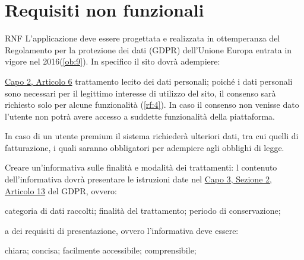 \section{Requisiti non funzionali}
\label{sec:RequisitiNonFunzionali}

\begin{listaPersonale}{RNF}
     L'applicazione deve essere progettata e realizzata in ottemperanza del Regolamento per la protezione dei dati (GDPR) dell'Unione Europa entrata in vigore nel 2016(\ref{ob:9}). In specifico il sito dovrà adempiere:
    \begin{listaPersonale2}{}
         \href{https://eur-lex.europa.eu/legal-content/IT/TXT/?uri=uriserv:OJ.L_.2016.119.01.0001.01.ITA&toc=OJ:L:2016:119:TOC#d1e1898-1-1}{Capo 2, Articolo 6} trattamento lecito dei dati personali; poiché i dati personali sono necessari per il legittimo interesse di utilizzo del sito, il consenso sarà richiesto solo per alcune funzionalità (\ref{rf:4}). In caso il consenso non venisse dato l'utente non potrà avere accesso a suddette funzionalità della piattaforma.
        \begin{listaPersonale3}{}
             In caso di un utente premium il sistema richiederà ulteriori dati, tra cui quelli di fatturazione, i quali saranno obbligatori per adempiere agli obblighi di legge.
        \end{listaPersonale3}

         Creare un'informativa sulle finalità e modalità dei trattamenti: l contenuto dell'informativa dovrà presentare le istruzioni date nel \href{https://eur-lex.europa.eu/legal-content/IT/TXT/?uri=uriserv:OJ.L_.2016.119.01.0001.01.ITA&toc=OJ:L:2016:119:TOC#d1e2261-1-1}{Capo 3, Sezione 2, Articolo 13} del GDPR, ovvero:

        \begin{listaPersonale3}{}
             categoria di dati raccolti;
             finalità del trattamento;
             periodo di conservazione;
        \end{listaPersonale3}

         a dei requisiti di presentazione, ovvero l'informativa deve essere:
        \begin{listaPersonale3}{}
             chiara;
             concisa;
             facilmente accessibile;
             comprensibile;
        \end{listaPersonale3}


\end{listaPersonale2}
\end{listaPersonale}
